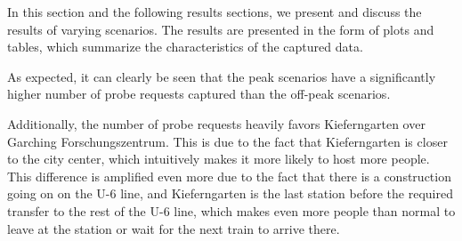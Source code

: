 \documentclass[sigconf,nonacm]{acmart}
\begin{document}
In this section and the following results sections, we present and discuss the results of varying scenarios. The results are presented in the form of plots and tables, which summarize the characteristics of the captured data.

\begin{table}[ht]
    \centering
    \caption{Overview of Probe Frame Counts, and RSSI Distribution}
    \label{tab:probe_frame_overview}
\end{table}

As expected, it can clearly be seen that the peak scenarios have a significantly higher number of probe requests captured than the off-peak scenarios.

Additionally, the number of probe requests heavily favors Kieferngarten over Garching Forschungszentrum. This is due to the fact that Kieferngarten is closer to the city center, which intuitively makes it more likely to host more people. This difference is amplified even more due to the fact that there is a construction going on on the U-6 line, and Kieferngarten is the last station before the required transfer to the rest of the U-6 line, which makes even more people than normal to leave at the station or wait for the next train to arrive there.
\end{document}
